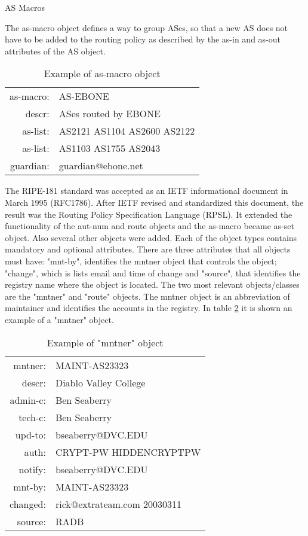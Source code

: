 \documentclass[11pt,a4paper]{scrreprt}
\begin{document}
        
AS Macros          
          
The as-macro object defines a way to group ASes, so that a new AS does not have to be added to the routing policy as described by the as-in and as-out attributes of the AS object.          
          
\begin{table}[!h]
\centering
\begin{tabular}{  r  l  }

as-macro:   	&      AS-EBONE\\
descr:    	&      ASes routed by EBONE\\
as-list:    	&      AS2121 AS1104 AS2600 AS2122\\
as-list:    	&      AS1103 AS1755 AS2043\\
guardian:   	&      guardian@ebone.net\\

\end{tabular}
\caption{Example of as-macro object}
\label{table:5}
\end{table} 

The RIPE-181 standard was accepted as an IETF informational document in March 1995 (RFC1786). After IETF revised and standardized this document, the result was the Routing Policy Specification Language (RPSL). It extended the functionality of the aut-num and route objects and the as-macro became as-set object. Also several other objects were added.
Each of the object types contains mandatory and optional attributes. There are three attributes that all objects must have: "mnt-by", identifies the mntner object that controls the object; "change", which is lists email and time of change and "source", that identifies the registry name where the object is located.
The two most relevant objects/classes are the "mntner" and "route" objects. The mntner object is an abbreviation of maintainer and identifies the accounts in the registry.
In table \ref{table:5} it is shown an example of a "mntner" object. 

\begin{table}[!h]
\centering
\begin{tabular}{  r  l  }

mntner:   	&      MAINT-AS23323\\
descr:    	&      Diablo Valley College\\
admin-c:    	&      Ben Seaberry\\
tech-c:    	&      Ben Seaberry\\
upd-to:   	&      bseaberry@DVC.EDU\\
auth:   		&      CRYPT-PW HIDDENCRYPTPW\\
notify:   	&      bseaberry@DVC.EDU\\
mnt-by:   	&      MAINT-AS23323\\
changed:   	&      rick@extrateam.com 20030311\\
source:   	&      RADB\\

\end{tabular}
\caption{Example of "mntner" object}
\label{table:5}
\end{table}
\end{document}
